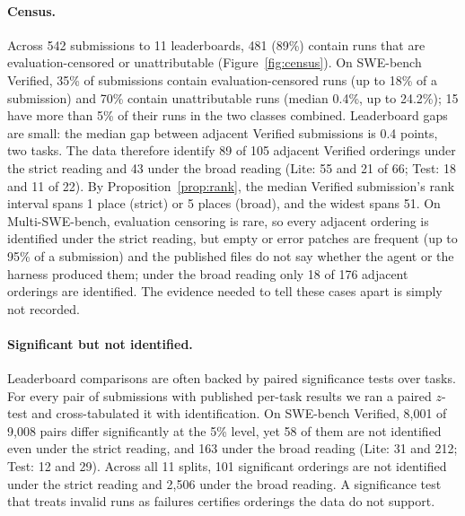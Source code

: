 \documentclass[11pt]{article}
\theoremstyle{definition}
\theoremstyle{remark}
\begin{document}
\paragraph{Census.} Across 542 submissions to 11 leaderboards, 481 (89\%)
contain runs that are evaluation-censored or unattributable
(Figure~\ref{fig:census}). On SWE-bench Verified, 35\% of submissions contain
evaluation-censored runs (up to 18\% of a submission) and 70\% contain
unattributable runs (median 0.4\%, up to 24.2\%); 15 have more than 5\% of their
runs in the two classes combined. Leaderboard gaps are small: the median gap
between adjacent Verified submissions is 0.4 points, two tasks. The data
therefore identify 89 of 105 adjacent Verified orderings under the strict reading
and 43 under the broad reading (Lite: 55 and 21 of 66; Test: 18 and 11 of 22).
By Proposition~\ref{prop:rank}, the median Verified submission's rank interval
spans 1 place (strict) or 5 places (broad), and the widest spans 51. On
Multi-SWE-bench, evaluation censoring is rare, so every adjacent ordering is
identified under the strict reading, but empty or error patches are frequent
(up to 95\% of a submission) and the published files do not say whether the
agent or the harness produced them; under the broad reading only 18 of 176
adjacent orderings are identified. The evidence needed to tell these cases apart
is simply not recorded.

\paragraph{Significant but not identified.} Leaderboard comparisons are often
backed by paired significance tests over tasks. For every pair of submissions
with published per-task results we ran a paired $z$-test and cross-tabulated it
with identification. On SWE-bench Verified, 8{,}001 of 9{,}008 pairs differ
significantly at the 5\% level, yet 58 of them are not identified even under the
strict reading, and 163 under the broad reading (Lite: 31 and 212; Test: 12 and
29). Across all 11 splits, 101 significant orderings are not identified under the
strict reading and 2{,}506 under the broad reading. A significance test that
treats invalid runs as failures certifies orderings the data do not support.
\end{document}
